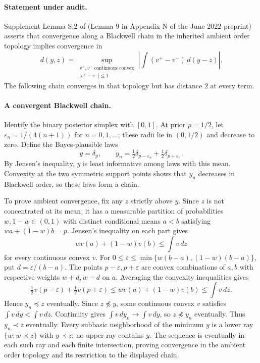 \documentclass[11pt]{article}
\theoremstyle{remark}\newtheorem{remark}[theorem]{Remark}
\begin{document}
\paragraph{Statement under audit.}
Supplement Lemma S.2 of \citet{Sinander2022} (Lemma 9 in Appendix N of
the June 2022 preprint) asserts that convergence along a Blackwell
chain in the inherited ambient order topology implies convergence in
\[
 d(y,z)=\sup_{\substack{v^+,v^-\text{ continuous convex}\\
                        |v^+-v^-|\le1}}
 \left|\int (v^+-v^-)\,d(y-z)\right|.
\]
The following chain converges in that topology but has distance $2$
at every term.

\paragraph{A convergent Blackwell chain.}
Identify the binary posterior simplex with $[0,1]$.  At prior $p=1/2$,
let $\varepsilon_n=1/(4(n+1))$ for $n=0,1,\ldots$; these radii lie in
$(0,1/2)$ and decrease to zero.  Define the Bayes-plausible laws
\[
 y=\delta_p,\qquad
 y_n=\tfrac12\delta_{p-\varepsilon_n}
       +\tfrac12\delta_{p+\varepsilon_n}.
\]
By Jensen's inequality, $y$ is least informative among laws with this
mean.  Convexity at the two symmetric support points shows that $y_n$
decreases in Blackwell order, so these laws form a chain.

To prove ambient convergence, fix any $z$ strictly above $y$.
Since $z$ is not concentrated at its mean, it has a measurable partition
of probabilities $w,1-w\in(0,1)$ with distinct conditional means
$a<b$ satisfying $wa+(1-w)b=p$.  Jensen's inequality on each part gives
\[
 wv(a)+(1-w)v(b)\le\int v\,dz
\]
for every continuous convex $v$.  For
$0\le\varepsilon\le\min\{w(b-a),(1-w)(b-a)\}$, put
$d=\varepsilon/(b-a)$.  The points $p-\varepsilon,p+\varepsilon$ are
convex combinations of $a,b$ with respective weights $w+d,w-d$ on $a$.
Averaging the convexity inequalities gives
\[
 \tfrac12v(p-\varepsilon)+\tfrac12v(p+\varepsilon)
 \le wv(a)+(1-w)v(b)\le\int v\,dz.
\]
Hence $y_n\preceq z$ eventually.  Since $z\not\preceq y$, some
continuous convex $v$ satisfies $\int v\,dy<\int v\,dz$.
Continuity gives $\int v\,dy_n\to\int v\,dy$, so
$z\not\preceq y_n$ eventually.  Thus $y_n\prec z$ eventually.
Every subbasic neighborhood of the minimum $y$ is a lower ray
$\{w:w\prec z\}$ with $y\prec z$; no upper ray contains $y$.
The sequence is eventually in each such ray and each finite intersection,
proving convergence in the ambient order topology and its restriction
to the displayed chain.
\end{document}
